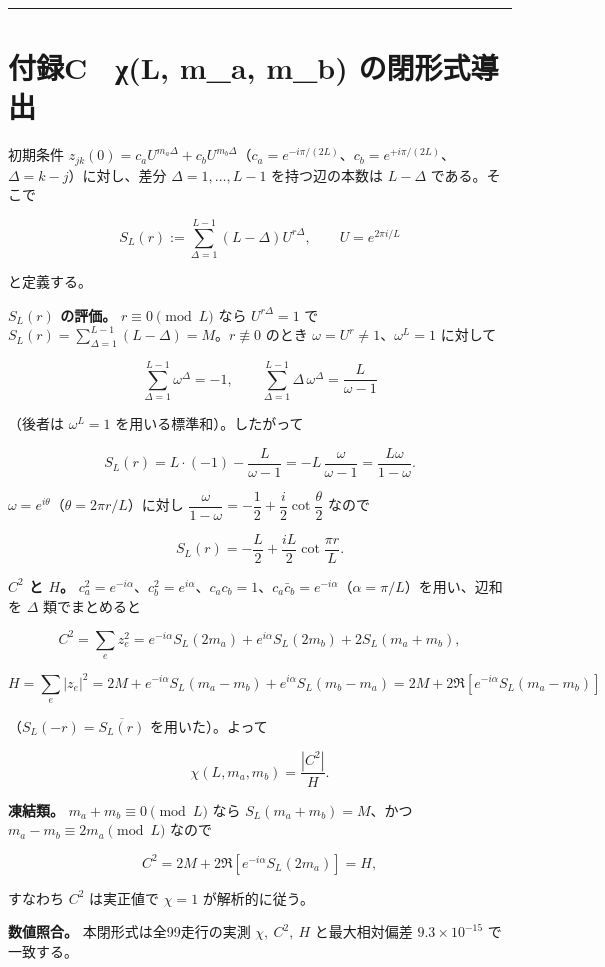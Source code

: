 \documentclass[
  a4paper,
]{ltjsarticle}
\begin{document}
\begin{center}\rule{0.5\linewidth}{0.5pt}\end{center}

\section{付録C　χ(L, m\_a, m\_b)
の閉形式導出}\label{ux4ed8ux9332c-ux3c7l-m_a-m_b-ux306eux9589ux5f62ux5f0fux5c0eux51fa}

初期条件
\(z_{jk}(0)=c_aU^{m_a\Delta}+c_bU^{m_b\Delta}\)（\(c_a=e^{-i\pi/(2L)}\)、\(c_b=e^{+i\pi/(2L)}\)、\(\Delta=k-j\)）に対し、差分
\(\Delta=1,\ldots,L-1\) を持つ辺の本数は \(L-\Delta\) である。そこで

\[
S_L(r):=\sum_{\Delta=1}^{L-1}(L-\Delta)U^{r\Delta},
\qquad U=e^{2\pi i/L}
\]

と定義する。

\textbf{\(S_L(r)\) の評価。} \(r\equiv0\pmod L\) なら \(U^{r\Delta}=1\)
で \(S_L(r)=\sum_{\Delta=1}^{L-1}(L-\Delta)=M\)。\(r\not\equiv0\) のとき
\(\omega=U^r\neq1\)、\(\omega^L=1\) に対して

\[
\sum_{\Delta=1}^{L-1}\omega^\Delta=-1,
\qquad
\sum_{\Delta=1}^{L-1}\Delta\,\omega^\Delta=\frac{L}{\omega-1}
\]

（後者は \(\omega^L=1\) を用いる標準和）。したがって

\[
S_L(r)=L\cdot(-1)-\frac{L}{\omega-1}
=-L\,\frac{\omega}{\omega-1}
=\frac{L\omega}{1-\omega}.
\]

\(\omega=e^{i\theta}\)（\(\theta=2\pi r/L\)）に対し
\(\dfrac{\omega}{1-\omega}=-\dfrac12+\dfrac i2\cot\dfrac\theta2\) なので

\[
S_L(r)=-\frac L2+\frac{iL}2\cot\frac{\pi r}{L}.
\]

\textbf{\(C^2\) と \(H\)。}
\(c_a^2=e^{-i\alpha}\)、\(c_b^2=e^{i\alpha}\)、\(c_ac_b=1\)、\(c_a\bar c_b=e^{-i\alpha}\)（\(\alpha=\pi/L\)）を用い、辺和を
\(\Delta\) 類でまとめると

\[
C^2=\sum_e z_e^2
=e^{-i\alpha}S_L(2m_a)+e^{i\alpha}S_L(2m_b)+2S_L(m_a+m_b),
\]

\[
H=\sum_e|z_e|^2
=2M+e^{-i\alpha}S_L(m_a-m_b)+e^{i\alpha}S_L(m_b-m_a)
=2M+2\Re\!\left[e^{-i\alpha}S_L(m_a-m_b)\right]
\]

（\(S_L(-r)=\overline{S_L(r)}\) を用いた）。よって

\[
\chi(L,m_a,m_b)=\frac{|C^2|}{H}.
\]

\textbf{凍結類。} \(m_a+m_b\equiv0\pmod L\) なら
\(S_L(m_a+m_b)=M\)、かつ \(m_a-m_b\equiv2m_a\pmod L\) なので

\[
C^2=2M+2\Re\!\left[e^{-i\alpha}S_L(2m_a)\right]=H,
\]

すなわち \(C^2\) は実正値で \(\chi=1\) が解析的に従う。

\textbf{数値照合。} 本閉形式は全99走行の実測 \(\chi,\ C^2,\ H\)
と最大相対偏差 \(9.3\times10^{-15}\) で一致する。
\end{document}
